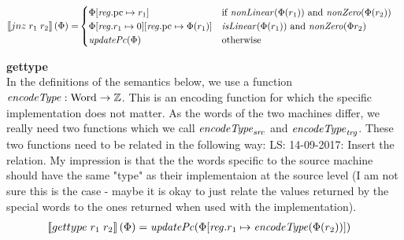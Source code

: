 \documentclass[a4paper]{article}
\newcommand\lau[1]{{\color{purple} \sf \footnotesize {LS: #1}}\\}
\newcommand{\sem}[1]{\left\llbracket #1 \right\rrbracket}
\newcommand{\tand}{\text{ and }}
\newcommand{\totherwise}{\text{otherwise }}
\newcommand{\targetcolor}[1]{\color{black}}
\newcommand{\trg}[1]{{\targetcolor{} #1}}
\newcommand{\zinstr}[1]{#1}
\newcommand{\twoinstr}[3]{
  \ifthenelse{\equal{#2#3}{}}
  {\zinstr{#1}}
  {\zinstr{#1} \; #2 \; #3}
}
\newcommand{\tjnz}[2]{\twoinstr{\trg{jnz}}{#1}{#2}}
\newcommand{\tisptr}[2]{\twoinstr{\trg{gettype}}{#1}{#2}}
\newcommand{\ints}{\mathbb{Z}}
\newcommand{\update}[2]{[#1 \mapsto #2]}
\newcommand{\updReg}[2]{\update{\reg.#1}{#2}}
\newcommand{\shareddom}[1]{\mathrm{#1}}
\newcommand{\Word}{\shareddom{Word}}
\newcommand{\var}[1]{\mathit{#1}}
\newcommand{\reg}{\var{reg}}
\newcommand{\pcreg}{\mathrm{pc}}
\newcommand{\plainfun}[2]{
  \ifthenelse{\equal{#2}{}}
  {\mathit{#1}}
  {\mathit{#1}(#2)}
}
\newcommand{\encType}[1]{\plainfun{encodeType}{#1}}
\newcommand{\updPcAddr}[1]{\plainfun{updatePc}{#1}}
\newcommand{\nonLinear}[1]{\plainfun{nonLinear}{#1}}
\newcommand{\isLinear}[1]{\plainfun{isLinear}{#1}}
\newcommand{\nonZero}[1]{\plainfun{nonZero}{#1}}
\begin{document}
\begin{align*}
  \sem{\tjnz{r_1}{r_2}}(\Phi) = &       
                             \begin{cases}
                               \Phi\updReg{\pcreg}{r_1} & \text{if $\nonLinear{\Phi(r_1)}$ and $\nonZero{\Phi(r_2)}$} \\
                               \Phi\updReg{r_1}{0}\updReg{\pcreg}{\Phi(r_1)}
                                               & \arraycolsep=0pt                               
                                               \begin{array}[t]{l}
                                                 \isLinear{\Phi(r_1)} \tand
                                                 \nonZero{\Phi{r_2}}
                                               \end{array}
\\
                               \updPcAddr{\Phi} & \totherwise
                             \end{cases}
\end{align*}

\noindent\textbf{gettype}\\
In the definitions of the semantics below, we use a function $\encType{} : \Word \rightarrow \ints$. This is an encoding function for which the specific implementation does not matter. As the words of the two machines differ, we really need two functions which we call $\encType{}_{\var{src}}$ and $\encType{}_{\var{trg}}$. These two functions need to be related in the following way:
\lau{14-09-2017: Insert the relation. My impression is that the the words specific to the source machine should have the same "type" as their implementaion at the source level (I am not sure this is the case - maybe it is okay to just relate the values returned by the special words to the ones returned when used with the implementation). }
\begin{align*}
  \sem{\tisptr{r_1}{r_2}}(\Phi) = & \; \updPcAddr{}(\Phi\updReg{r_1}{\encType{\Phi(r_2)}})
\end{align*}
\end{document}
